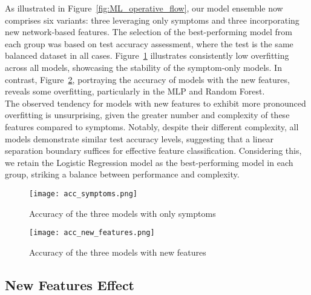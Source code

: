 As illustrated in Figure~\ref{fig:ML_operative_flow}, our model ensemble now comprises six variants:
three leveraging only symptoms and three incorporating new network-based features. The selection of
the best-performing model from each group was based on test accuracy assessment, where the test is the same balanced dataset
in all cases. Figure~\ref{fig:acc_symptoms}
illustrates consistently low overfitting across all models, showcasing the stability of the symptom-only
models. In contrast, Figure~\ref{fig:acc_new_features}, portraying the accuracy of models with the new
features, reveals some overfitting, particularly in the MLP and Random Forest.\\
The observed tendency for models with new features to exhibit more pronounced overfitting is unsurprising,
given the greater number and complexity of these features compared to symptoms. Notably, despite their different
complexity, all models demonstrate similar test accuracy levels, suggesting that a linear separation
boundary suffices for effective feature classification. Considering this, we retain the Logistic Regression
model as the best-performing model in each group, striking a balance between performance and complexity.

\begin{figure}[H]
	\centering
	\texttt{[image: acc\_symptoms.png]}
	\caption{Accuracy of the three models with only symptoms}\label{fig:acc_symptoms}
\end{figure}

\begin{figure}[H]
	\centering
	\texttt{[image: acc\_new\_features.png]}
	\caption{Accuracy of the three models with new features}\label{fig:acc_new_features}
\end{figure}




\subsection{New Features Effect}

